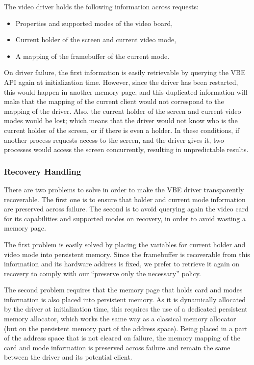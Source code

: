 \documentclass[times, 10pt, twocolumn]{article}
\begin{document}
The video driver holds the following information across requests:
\begin{itemize}
\item Properties and supported modes of the video board,
\item Current holder of the screen and current video mode,
\item A mapping of the framebuffer of the current mode.
\end{itemize}

On driver failure, the first information is easily retrievable by querying the VBE API again at initialization time. However, since the driver has been restarted, this would happen in another memory page, and this duplicated information will make that the mapping of the current client would not correspond to the mapping of the driver. Also, the current holder of the screen and current video modes would be lost; which means that the driver would not know who is the current holder of the screen, or if there is even a holder. In these conditions, if another process requests access to the screen, and the driver gives it, two processes would access the screen concurrently, resulting in unpredictable results.

\subsubsection{Recovery Handling}
There are two problems to solve in order to make the VBE driver transparently recoverable. The first one is to ensure that holder and current mode information are preserved across failure. The second is to avoid querying again the video card for its capabilities and supported modes on recovery, in order to avoid wasting a memory page.

The first problem is easily solved by placing the variables for current holder and video mode into persistent memory. Since the framebuffer is recoverable from this information and its hardware address is fixed, we prefer to retrieve it again on recovery to comply with our ``preserve only the necessary'' policy.

The second problem requires that the memory page that holds card and modes information is also placed into persistent memory. As it is dynamically allocated by the driver at initialization time, this requires the use of a dedicated persistent memory allocator, which works the same way as a classical memory allocator (but on the persistent memory part of the address space). Being placed in a part of the address space that is not cleared on failure, the memory mapping of the card and mode information is preserved across failure and remain the same between the driver and its potential client.
\end{document}
